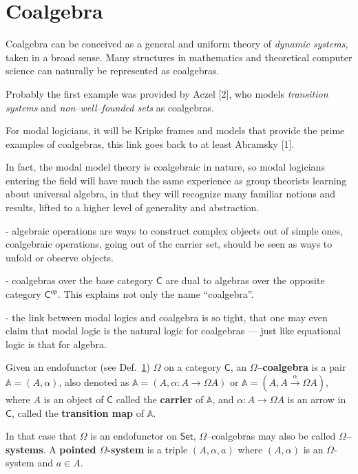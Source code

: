 \section{Coalgebra}


Coalgebra can be conceived as a general and uniform theory of \textit{dynamic systems}, taken in a broad sense. 
% 
Many structures in mathematics and theoretical computer science can naturally be represented as coalgebras.



Probably the first example was provided by Aczel [2], 
who models \textit{transition systems} and \textit{non--well--founded sets} as coalgebras. 


\vspace{2em}


For \textsf{modal logicians}, 
it will be Kripke \textsf{frames} and \textsf{models} that provide the prime examples of coalgebras, 
this link goes back to at least Abramsky [1].


In fact, 
the modal model theory is coalgebraic in nature, so modal logicians entering the field will have much the same experience as group theorists learning about universal algebra, 
in that they will recognize many familiar notions and results, 
lifted to a higher level of generality and abstraction.

\vspace{2em}


- {\color{purple} algebraic operations} are ways to construct complex objects out of simple ones, 
{\color{purple} coalgebraic operations}, going out of the carrier set, should be seen as ways to unfold or observe objects.



- coalgebras over the base category $\mathsf{C}$ are dual to algebras over the opposite category $\mathsf{C}^{op}$. 
This explains not only the name ``coalgebra''.


- the link between modal logics and coalgebra is so tight, that one may even claim that {\color{teal} modal logic is the natural logic for coalgebras --- just like equational logic is that for algebra}.





\begin{df}[Coalgebras] 
	Given an endofunctor (see Def.~\ref{}) $\Omega$ on a category $\mathsf{C}$, 
	an \textbf{$\Omega$--coalgebra} is a pair {\color{red} $\mathbb{A} = (A,\alpha)$}, 
	also denoted as {\color{red} $\mathbb{A} = (A, \alpha \colon A \to \Omega A)$} or {\color{red} $\mathbb{A} = (A, A \xrightarrow{\alpha} \Omega A)$}, 
	where $A$ is an object of $\mathsf{C}$ called the \textbf{carrier} of $\mathbb{A}$, 
	and $\alpha \colon A \to \Omega A$ is an arrow in $\mathsf{C}$, 
	called the \textbf{transition map} of $\mathbb{A}$. 

	In that case that $\Omega$ is an endofunctor on $\mathsf{Set}$, 
	$\Omega$--coalgebras may also be called \textbf{$\Omega$--systems}. 
	A \textbf{pointed $\Omega$-system} is a triple {\color{red} $(A,\alpha,a)$} where $(A,\alpha)$ is an $\Omega$-system and $a \in A$. 
\end{df}


